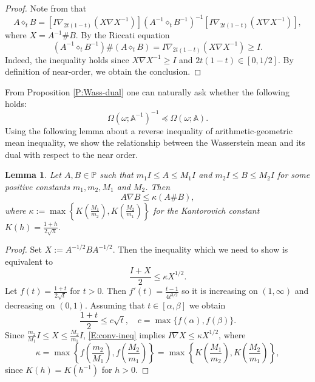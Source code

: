 \documentclass[12pt,reqno]{amsart}
\newtheorem{lemma}[theorem]{Lemma}
\begin{document}
\begin{proof}
Note from \cite{HK} that
\begin{displaymath}
A \diamond_{t} B = \left[ I \nabla_{2t(1-t)} (X \nabla X^{-1}) \right] (A^{-1} \diamond_{t} B^{-1})^{-1} \left[ I \nabla_{2t(1-t)} (X \nabla X^{-1}) \right],
\end{displaymath}
where $X = A^{-1} \# B$. By the Riccati equation
\begin{displaymath}
(A^{-1} \diamond_{t} B^{-1}) \# (A \diamond_{t} B) = I \nabla_{2t(1-t)} (X \nabla X^{-1}) \geq I.
\end{displaymath}
Indeed, the inequality holds since $X \nabla X^{-1} \geq I$ and $2t(1-t) \in [0,1/2]$. By definition of near-order, we obtain the conclusion.
\end{proof}

From Proposition \ref{P:Wass-dual} one can naturally ask whether the following holds:
\begin{displaymath}
\Omega(\omega; \mathbb{A}^{-1})^{-1} \preceq \Omega(\omega; \mathbb{A}).
\end{displaymath}
Using the following lemma about a reverse inequality of arithmetic-geometric mean inequality,
we show the relationship between the Wasserstein mean and its dual with respect to the near order.

\begin{lemma} \label{L:converse}
Let $A, B \in \mathbb{P}$ such that $m_{1} I \leq A \leq M_{1} I$ and $m_{2} I \leq B \leq M_{2} I$ for some positive constants $m_{1}, m_{2}, M_{1}$ and $M_{2}$. Then
\begin{displaymath}
A \nabla B \leq \kappa (A \# B),
\end{displaymath}
where $\displaystyle \kappa := \max \left\{ K \left( \frac{M_{1}}{m_{2}} \right), K \left( \frac{M_{2}}{m_{1}} \right) \right\}$ for the Kantorovich constant $\displaystyle K(h) = \frac{1 + h}{2 \sqrt{h}}$.
\end{lemma}

\begin{proof}
Set $X := A^{-1/2} B A^{-1/2}$. Then the inequality which we need to show is equivalent to
\begin{displaymath}
\frac{I + X}{2} \leq \kappa X^{1/2}.
\end{displaymath}
Let $\displaystyle f(t) = \frac{1+t}{2\sqrt{t}}$ for $t > 0$. Then $\displaystyle f'(t) = \frac{t-1}{4 t^{3/2}}$ so it is increasing on $(1,\infty)$ and decreasing on $(0,1)$. Assuming that $t \in [\alpha, \beta]$ we obtain
\begin{equation} \label{E:conv-ineq}
\frac{1+t}{2} \leq c \sqrt{t}, \quad c = \max \{ f(\alpha), f(\beta) \}.
\end{equation}
Since $\displaystyle \frac{m_{2}}{M_{1}} I \leq X \leq \frac{M_{2}}{m_{1}} I$, \eqref{E:conv-ineq} implies $I \nabla X \leq \kappa X^{1/2}$, where
\begin{displaymath}
\kappa = \max \left\{ f \left( \frac{m_{2}}{M_{1}} \right), f \left( \frac{M_{2}}{m_{1}} \right) \right\} = \max \left\{ K \left( \frac{M_{1}}{m_{2}} \right), K \left( \frac{M_{2}}{m_{1}} \right) \right\},
\end{displaymath}
since $K(h) = K(h^{-1})$ for $h > 0$.
\end{proof}
\end{document}
